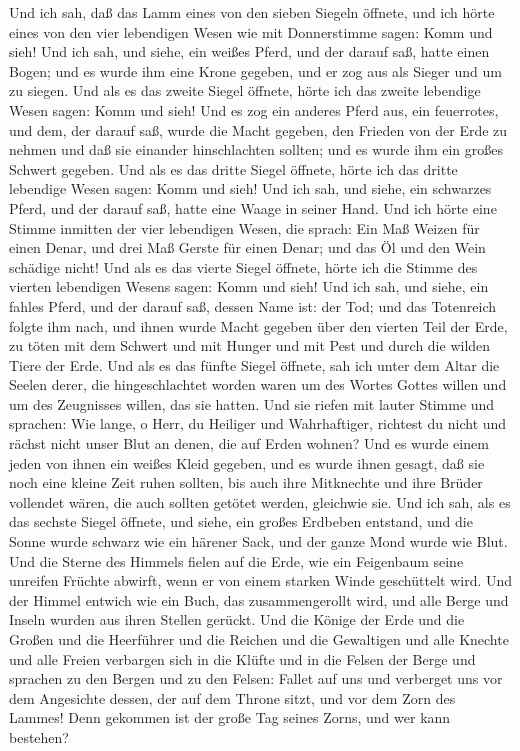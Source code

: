  Und ich sah, daß das Lamm eines von den sieben Siegeln
öffnete, und ich hörte eines von den vier lebendigen Wesen wie mit
Donnerstimme sagen: Komm und sieh!  Und ich sah, und
siehe, ein weißes Pferd, und der darauf saß, hatte einen Bogen; und es
wurde ihm eine Krone gegeben, und er zog aus als Sieger und um zu
siegen.  Und als es das zweite Siegel öffnete, hörte ich
das zweite lebendige Wesen sagen: Komm und sieh!  Und es
zog ein anderes Pferd aus, ein feuerrotes, und dem, der darauf saß,
wurde die Macht gegeben, den Frieden von der Erde zu nehmen und daß sie
einander hinschlachten sollten; und es wurde ihm ein großes Schwert
gegeben.  Und als es das dritte Siegel öffnete, hörte ich
das dritte lebendige Wesen sagen: Komm und sieh! Und ich sah, und siehe,
ein schwarzes Pferd, und der darauf saß, hatte eine Waage in seiner
Hand.  Und ich hörte eine Stimme inmitten der vier
lebendigen Wesen, die sprach: Ein Maß Weizen für einen Denar, und drei
Maß Gerste für einen Denar; und das Öl und den Wein schädige nicht!
 Und als es das vierte Siegel öffnete, hörte ich die
Stimme des vierten lebendigen Wesens sagen: Komm und sieh!
 Und ich sah, und siehe, ein fahles Pferd, und der darauf
saß, dessen Name ist: der Tod; und das Totenreich folgte ihm nach, und
ihnen wurde Macht gegeben über den vierten Teil der Erde, zu töten mit
dem Schwert und mit Hunger und mit Pest und durch die wilden Tiere der
Erde.  Und als es das fünfte Siegel öffnete, sah ich unter
dem Altar die Seelen derer, die hingeschlachtet worden waren um des
Wortes Gottes willen und um des Zeugnisses willen, das sie hatten.
 Und sie riefen mit lauter Stimme und sprachen: Wie
lange, o Herr, du Heiliger und Wahrhaftiger, richtest du nicht und
rächst nicht unser Blut an denen, die auf Erden wohnen? 
Und es wurde einem jeden von ihnen ein weißes Kleid gegeben, und es
wurde ihnen gesagt, daß sie noch eine kleine Zeit ruhen sollten, bis
auch ihre Mitknechte und ihre Brüder vollendet wären, die auch sollten
getötet werden, gleichwie sie.  Und ich sah, als es das
sechste Siegel öffnete, und siehe, ein großes Erdbeben entstand, und die
Sonne wurde schwarz wie ein härener Sack, und der ganze Mond wurde wie
Blut.  Und die Sterne des Himmels fielen auf die Erde,
wie ein Feigenbaum seine unreifen Früchte abwirft, wenn er von einem
starken Winde geschüttelt wird.  Und der Himmel entwich
wie ein Buch, das zusammengerollt wird, und alle Berge und Inseln wurden
aus ihren Stellen gerückt.  Und die Könige der Erde und
die Großen und die Heerführer und die Reichen und die Gewaltigen und
alle Knechte und alle Freien verbargen sich in die Klüfte und in die
Felsen der Berge  und sprachen zu den Bergen und zu den
Felsen: Fallet auf uns und verberget uns vor dem Angesichte dessen, der
auf dem Throne sitzt, und vor dem Zorn des Lammes!  Denn
gekommen ist der große Tag seines Zorns, und wer kann bestehen?

